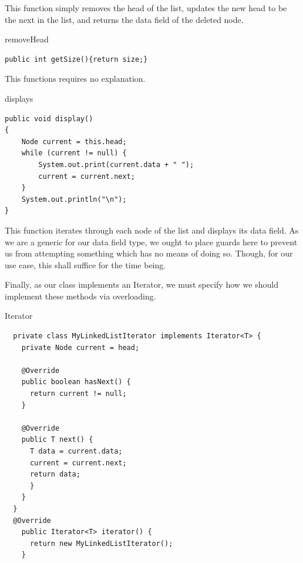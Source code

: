 \documentclass[a4paper]{article}
\begin{document}
This function simply removes the head of the list, 
updates the new head to be the next in the list, 
and returns the data field of the deleted node. \\



\begin{algorithm}
\caption{removeHead}\label{euclid}
\begin{verbatim}
public int getSize(){return size;}
\end{verbatim}
\end{algorithm}

This functions requires no explanation.






\begin{algorithm}
\caption{displays}\label{euclid}
\begin{verbatim}
public void display()
{
    Node current = this.head;
    while (current != null) {
        System.out.print(current.data + " ");
        current = current.next;
    }
    System.out.println("\n");
}
\end{verbatim}
\end{algorithm}

This function iterates through each node of the list 
and displays its data field. As we are a generic for our
data field type, we ought to place guards here to prevent 
us from attempting something which has no means of doing so.
Though, for our use case, this shall suffice for the time being.

\newpage



Finally, as our class implements an Iterator, we must specify 
how we should implement these methods via overloading.


\vspace{6mm}
\makeatletter
\renewcommand{\ALG@name}{Nested Class}
\makeatother
\setcounter{algorithm}{1}


\begin{algorithm}
\caption{Iterator}\label{euclid}
\begin{verbatim}
  private class MyLinkedListIterator implements Iterator<T> {
    private Node current = head;

    @Override
    public boolean hasNext() {
      return current != null;
    }

    @Override
    public T next() {
      T data = current.data;
      current = current.next;
      return data;
      }
    }
  }
  @Override
    public Iterator<T> iterator() {
      return new MyLinkedListIterator();
    }
\end{verbatim}
\end{algorithm}
\vspace{8mm}
\end{document}
